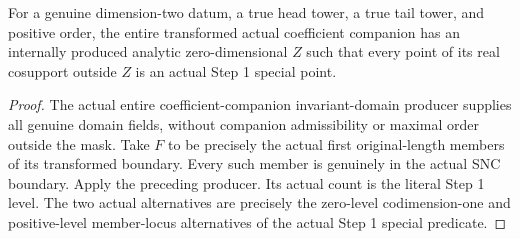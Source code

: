 \begin{theorem}
\label{hir:general-two-entire-companion-special-exception}
\leanok
For a genuine dimension-two datum, a true head tower, a true tail tower,
and positive order, the entire transformed actual coefficient companion
has an internally produced analytic zero-dimensional $Z$ such that every
point of its real cosupport outside $Z$ is an actual Step 1 special point.
\end{theorem}
\begin{proof}
The actual entire coefficient-companion invariant-domain producer supplies
all genuine domain fields, without companion admissibility or maximal order
outside the mask. Take $F$ to be precisely the actual first original-length
members of its transformed boundary. Every such member is genuinely in the
actual SNC boundary. Apply the preceding producer. Its actual count is
the literal Step 1 level. The two actual alternatives are precisely the
zero-level codimension-one and positive-level member-locus alternatives
of the actual Step 1 special predicate.
\end{proof}

